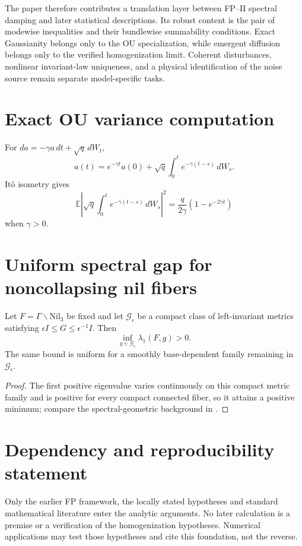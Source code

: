 \documentclass[11pt]{article}
\begin{document}
The paper therefore contributes a translation layer between FP--II spectral
damping and later statistical descriptions.  Its robust content is the pair
of modewise inequalities and their bundlewise summability conditions.  Exact
Gaussianity belongs only to the OU specialization, while emergent diffusion
belongs only to the verified homogenization limit.  Coherent disturbances,
nonlinear invariant-law uniqueness, and a physical identification of the
noise source remain separate model-specific tasks.

\appendix

\section{Exact OU variance computation}

For $da=-\gamma a\,dt+\sqrt q\,dW_t$,
\[
a(t)=e^{-\gamma t}a(0)+\sqrt q\int_0^t e^{-\gamma(t-s)}\,dW_s.
\]
It\^o isometry gives
\[
\mathbb E\left|\sqrt q\int_0^t e^{-\gamma(t-s)}\,dW_s\right|^2
=\frac{q}{2\gamma}(1-e^{-2\gamma t})
\]
when $\gamma>0$.

\section{Uniform spectral gap for noncollapsing nil fibers}\label{app:nilgap}

\begin{proposition}
Let $F=\Gamma\backslash\mathrm{Nil}_3$ be fixed and let
$\mathcal G_\epsilon$ be a compact class of left-invariant metrics satisfying
$\epsilon I\le G\le\epsilon^{-1}I$. Then
\[
\inf_{g\in\mathcal G_\epsilon}\lambda_1(F,g)>0.
\]
The same bound is uniform for a smoothly base-dependent family remaining in
$\mathcal G_\epsilon$.
\end{proposition}

\begin{proof}
The first positive eigenvalue varies continuously on this compact metric
family and is positive for every compact connected fiber, so it attains a
positive minimum; compare the spectral-geometric background in
\cite{Chavel1984,Buser1982,Kato1976,Hebey2000}.
\end{proof}




\section*{Dependency and reproducibility statement}
Only the earlier FP framework, the locally stated hypotheses and standard
mathematical literature enter the analytic arguments. No later calculation
is a premise or a verification of the homogenization hypotheses. Numerical
applications may test those hypotheses and cite this foundation, not the
reverse.
\end{document}
